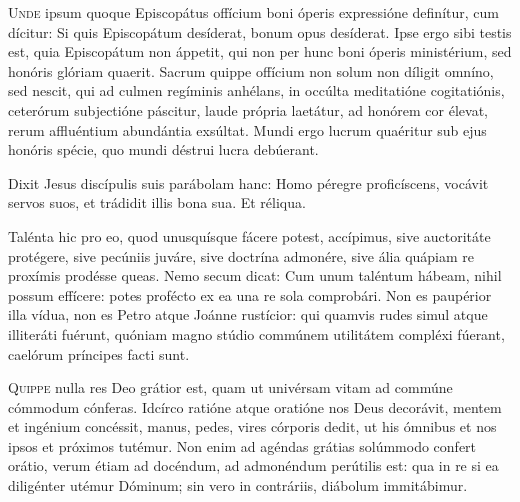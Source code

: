 
\lettrine{U}{nde} ipsum quoque Episcopátus offícium boni óperis
expressióne definítur, cum dícitur:
Si quis Episcopátum desíderat, bonum opus desíderat.
Ipse ergo sibi testis est, quia Episcopátum non áppetit,
qui non per hunc boni óperis ministérium,
sed honóris glóriam quaerit.
Sacrum quippe offícium non solum non díligit omníno,
sed nescit, qui ad culmen regíminis anhélans,
in occúlta meditatióne cogitatiónis,
ceterórum subjectióne páscitur,
laude própria laetátur,
ad honórem cor élevat,
rerum affluéntium abundántia exsúltat.
Mundi ergo lucrum quaéritur sub ejus honóris spécie,
quo mundi déstrui lucra debúerant.

\horaNocturnusIII



\inIlloTempore{}
Dixit Jesus discípulis suis parábolam hanc:
Homo péregre proficíscens, vocávit servos suos,
et trádidit illis bona sua.
Et réliqua.


Talénta hic pro eo, quod unusquísque fácere potest,
accípimus, sive auctoritáte protégere,
sive pecúniis juváre,
sive doctrína admonére,
sive ália quápiam re proxímis prodésse queas.
Nemo secum dicat: Cum unum taléntum hábeam,
nihil possum effícere: potes profécto ex ea una re sola comprobári.
Non es paupérior illa vídua, non es Petro atque Joánne rustícior:
qui quamvis rudes simul atque illiteráti fuérunt,
quóniam magno stúdio commúnem utilitátem compléxi fúerant,
caelórum príncipes facti sunt.



\lettrine{Q}{uippe} nulla res Deo grátior est,
quam ut univérsam vitam ad commúne cómmodum cónferas.
Idcírco ratióne atque oratióne nos Deus decorávit,
mentem et ingénium concéssit,
manus, pedes, vires córporis dedit,
ut his ómnibus et nos ipsos et próximos tutémur.
Non enim ad agéndas grátias solúmmodo confert orátio,
verum étiam ad docéndum, ad admonéndum perútilis est:
qua in re si ea diligénter utémur Dóminum;
sin vero in contráriis, diábolum immitábimur.



